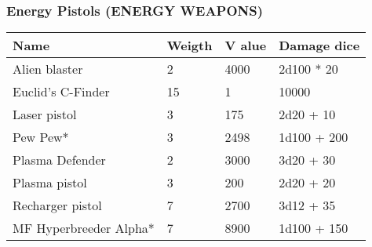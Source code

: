 
\subsubsection{Energy Pistols (ENERGY WEAPONS)}
\begin{longtable}{|p{4cm}|p{1.5cm}|p{1.5cm}|p{9cm}|}
\hline
\bfseries Name & \bfseries Weigth & \bfseries V alue & \bfseries Damage dice \\
\hline
\endhead
Alien blaster & 2 & 4000 & 2d100 * 20 \\
Euclid's C-Finder & 15 & 1 & 10000 \\
Laser pistol & 3 & 175 & 2d20 + 10 \\
Pew Pew* & 3 & 2498 & 1d100 + 200 \\
Plasma Defender & 2 & 3000 & 3d20 + 30 \\
Plasma pistol & 3 & 200 & 2d20 + 20 \\
Recharger pistol & 7 & 2700 & 3d12 + 35 \\
MF Hyperbreeder Alpha* & 7 & 8900 & 1d100 + 150 \\
\hline
\end{longtable}
